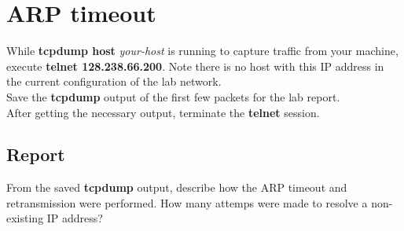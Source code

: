 \documentclass[10pt,a4paper]{article}
\numberwithin{equation}{section}
\numberwithin{figure}{section}
\numberwithin{table}{section}
\begin{document}
\section{ARP timeout}
    While \textbf{tcpdump host} \textit{your-host} is running to capture traffic from your machine, execute \textbf{telnet 128.238.66.200}.
    Note there is no host with this IP address in the current configuration of the lab network. \\
    Save the \textbf{tcpdump} output of the first few packets for the lab report. \\
    After getting the necessary output, terminate the \textbf{telnet} session.
    \subsection*{Report}
    From the saved \textbf{tcpdump} output, describe how the ARP timeout and retransmission were performed.
    How many attemps were made to resolve a non-existing IP address?
\end{document}
